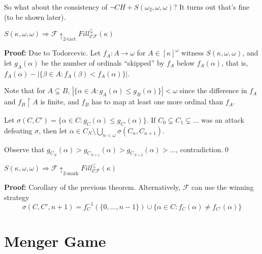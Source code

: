 \documentclass{beamer}
\theoremstyle{theorem}
\theoremstyle{definition}
\newcommand{\ktactwin}[1]{\uparrow_{#1\text{-tact}}}
\newcommand{\kmarkwin}[1]{\uparrow_{#1\text{-mark}}}
\newcommand{\kfillgame}[1]{Fill^{\subseteq}_{\pl C\pl F}(#1)}
\newcommand{\ksfillgame}[1]{Fill^{\subsetneq}_{\pl C\pl F}(#1)}
\newcommand{\rest}{\restriction}
\newcommand{\<}{\langle}
\renewcommand{\>}{\rangle}
\newcommand{\pl}[1]{\mathscr{#1}}
\begin{document}
\begin{frame}
  So what about the consistency of $\neg CH + S(\omega_2,\omega,\omega)$? It turns out that's fine (to be shown later).
 
  \pause

  \begin{theorem}
    $S(\kappa,\omega,\omega) \Rightarrow \pl F \ktactwin{2} \ksfillgame{\kappa}$
  \end{theorem}\pause

  \textbf{Proof:} Due to Todorcevic. Let $f_A:A\to\omega$ for $A\in[\kappa]^\omega$ witness $S(\kappa,\omega,\omega)$, and let $g_A(\alpha)$ be the number of ordinals ``skipped'' by $f_A$ below $f_A(\alpha)$, that is, $f_A(\alpha)-|\{\beta\in A:f_A(\beta)<f_A(\alpha)\}|$.
  \pause\vspace{6pt}

  Note that for $A\subsetneq B$, $|\{\alpha\in A:g_A(\alpha)\leq g_B(\alpha)\}|<\omega$ since the difference in $f_A$ and $f_B\rest A$ is finite, and $f_B$ has to map at least one more ordinal than $f_A$.
  \pause\vspace{6pt}

  Let $\sigma(C,C')=\{\alpha\in C: g_C(\alpha)\leq g_{C'}(\alpha)\}$. If $C_0\subsetneq C_1\subsetneq\dots$ was an attack defeating $\sigma$, then let $\alpha\in C_N\setminus\bigcup_{n<\omega}\sigma(C_n,C_{n+1})$.
  \pause\vspace{6pt}

  Observe that $g_{C_N}(\alpha)>g_{C_{N+1}}(\alpha)>g_{C_{N+2}}(\alpha)>\dots$, contradiction.\qed

\end{frame}

\begin{frame}

  \begin{theorem}
    $S(\kappa,\omega,\omega) \Rightarrow \pl F \kmarkwin{2} \kfillgame{\kappa}$
  \end{theorem}

  \textbf{Proof:} 
    Corollary of the previous theorem. Alternatively, $\pl F$ can use the winning strategy
      \[
        \sigma(C,C',n+1)=f_C^{-1}(\{0,\dots,n-1\}) \cup \{\alpha\in C: f_C(\alpha)\not= f_{C'}(\alpha)\}
      \]

\end{frame}

\section{Menger Game}
\end{document}

